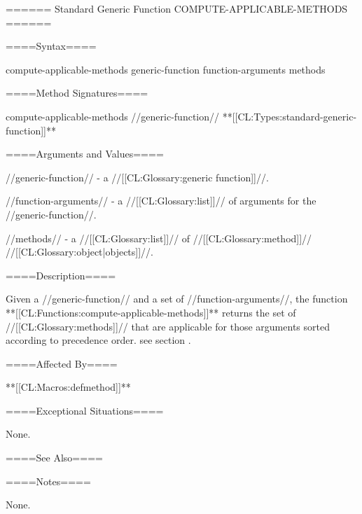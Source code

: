 ====== Standard Generic Function COMPUTE-APPLICABLE-METHODS ======



====Syntax====

\DefgenWithValues compute-applicable-methods {generic-function function-arguments} {methods}

====Method Signatures====

\Defmeth compute-applicable-methods {//generic-function// **[[CL:Types:standard-generic-function]]**}



====Arguments and Values====

//generic-function// - a //[[CL:Glossary:generic function]]//.

//function-arguments// - a //[[CL:Glossary:list]]// of arguments for the //generic-function//.

//methods// - a //[[CL:Glossary:list]]// of //[[CL:Glossary:method]]// //[[CL:Glossary:object|objects]]//.

====Description====

Given a //generic-function// and a set of //function-arguments//, the function **[[CL:Functions:compute-applicable-methods]]** returns the set of //[[CL:Glossary:methods]]// that are applicable for those arguments sorted according to precedence order. see section {\secref\MethodSelectionAndCombination}.

====Affected By====

**[[CL:Macros:defmethod]]**

====Exceptional Situations====

None.

====See Also====

{\secref\MethodSelectionAndCombination}

====Notes====

None.


